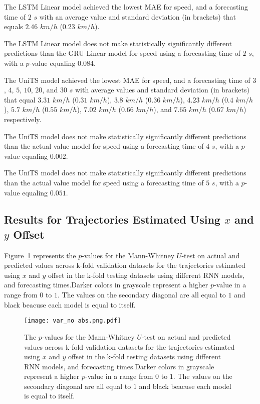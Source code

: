 The LSTM Linear model achieved the lowest MAE for speed, and a forecasting time of $2$ $s$ with an average value and standard deviation (in brackets) that equals $2.46$ $km/h$ ($0.23$ $km/h$).

The LSTM Linear model does not make statistically significantly different predictions than the GRU Linear model for speed using a forecasting time of $2$ $s$, with a $p$-value equaling $0.084$.

The UniTS model achieved the lowest MAE for speed, and a forecasting time of $3$, $4$, $5$, $10$, $20$, and $30$ $s$ with average values and standard deviation (in brackets) that equal $3.31$ $km/h$ ($0.31$ $km/h$), $3.8$ $km/h$ ($0.36$ $km/h$), $4.23$ $km/h$ ($0.4$ $km/h$), $5.7$ $km/h$ ($0.55$ $km/h$), $7.02$ $km/h$ ($0.66$ $km/h$), and $7.65$ $km/h$ ($0.67$ $km/h$) respectively.

The UniTS model does not make statistically significantly different predictions than the actual value model for speed using a forecasting time of $4$ $s$, with a $p$-value equaling $0.002$.

The UniTS model does not make statistically significantly different predictions than the actual value model for speed using a forecasting time of $5$ $s$, with a $p$-value equaling $0.051$.

\subsection{Results for Trajectories Estimated Using $x$ and $y$ Offset}

Figure~\ref{fig:var_no abs.png} represents the $p$-values for the Mann-Whitney $U$-test on actual and predicted values across k-fold validation datasets for the trajectories estimated using $x$ and $y$ offset in the k-fold testing datasets using different RNN models, and forecasting times.Darker colors in grayscale represent a higher $p$-value in a range from $0$ to $1$. The values on the secondary diagonal are all equal to $1$ and black beacuse each model is equal to itself.

\begin{figure}[!ht]
	\centering
	\texttt{[image: var\_no abs.png.pdf]}
	\caption{The $p$-values for the Mann-Whitney $U$-test on actual and predicted values across k-fold validation datasets for the trajectories estimated using $x$ and $y$ offset in the k-fold testing datasets using different RNN models, and forecasting times.Darker colors in grayscale represent a higher $p$-value in a range from $0$ to $1$. The values on the secondary diagonal are all equal to $1$ and black beacuse each model is equal to itself.}
	\label{fig:var_no abs.png}
\end{figure}

